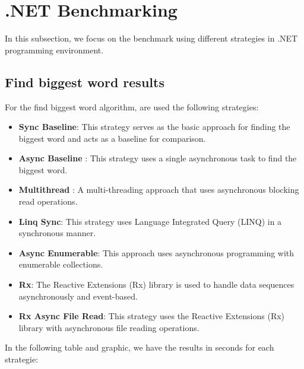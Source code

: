 \clearpage

\section{.NET Benchmarking}
\label{sec:dotnet_implementation}

In this subsection, we focus on the benchmark using different strategies in .NET programming environment.



\subsection{Find biggest word  results}
\label{subsubsec:biggest_word_results_cs}

For the find biggest word algorithm, are used the following strategies:

\begin{itemize}
    \item \textbf{Sync Baseline}: This strategy serves as the basic approach for finding the biggest word and acts as a baseline for comparison.
    \item \textbf{Async Baseline }: This strategy uses a single asynchronous task to find the biggest word.
    \item \textbf{Multithread }: A multi-threading approach that uses asynchronous blocking read operations.
    \item \textbf{Linq Sync}: This strategy uses Language Integrated Query (LINQ) in a synchronous manner.
    \item \textbf{Async Enumerable}: This approach uses asynchronous programming with enumerable collections.
    \item \textbf{Rx}: The Reactive Extensions (Rx) library is used to handle data sequences asynchronously and event-based.
    \item \textbf{Rx Async File Read}: This strategy uses the Reactive Extensions (Rx) library with asynchronous file reading operations.
\end{itemize}


In the following table and graphic, we have the results in seconds for each strategie:

\begin{table}[H]
    \centering
    \caption{Processing times for different strategies for "Find the biggest word".}
    \label{tab:biggest_word_results_cs_1}
\end{table}
    
